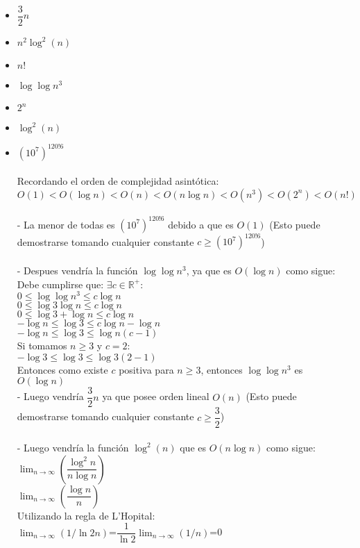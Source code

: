 \documentclass[10pt]{article}
\begin{document}
\begin{enumerate}
\begin{itemize}
  \item $\dfrac{3}{2}n$
  \item $n^2\log^2(n)$
  \item $n!$
  \item $\log \log n^3$
  \item $2^n$
  \item $\log^2(n)$
  \item $(10^7)^{120!6}$
  \\\\Recordando el orden de complejidad asintótica:\\$O(1)<O(\log n)<O(n)<O(n\log n)<O(n^3)<O(2^n)<O(n!)$\\
  \\- La menor de todas es $(10^7)^{120!6}$ debido a que es $O(1)$ (Esto puede demostrarse tomando cualquier constante $c\geq(10^7)^{120!6}$)\\\\
  - Despues vendría la función $\log \log n^3$, ya que es $O(\log n)$ como sigue:\\
  Debe cumplirse que: $\exists c\in\mathbb{R^+}$:\\
  $0\leq \log \log n^3\leq c\log n$\\
  $0\leq \log 3\log n\leq c\log n$\\
  $0\leq \log 3 +\log n\leq c\log n$\\
  $-\log n\leq \log 3\leq c\log n - \log n$\\
  $-\log n\leq \log 3\leq \log n(c-1)$\\
  Si tomamos $n\geq3$ y $c=2$:\\ $-\log 3\leq \log 3\leq \log 3(2-1)$\\
  Entonces como existe $c$ positiva para $n\geq3$, entonces $\log \log n^3$ es $O(\log n)$\\
  - Luego vendría $\dfrac{3}{2}n$ ya que posee orden lineal $O(n)$ (Esto puede demostrarse tomando cualquier constante $c\geq\dfrac{3}{2}$)\\\\
  - Luego vendría la función $\log^2(n)$ que es $O(n\log n)$ como sigue:\\
  $\lim_{n \to \infty}(\dfrac{\log^2n}{n\log n})$\\
  $\lim_{n \to \infty}(\dfrac{\log n}{n})$\\
  Utilizando la regla de L'Hopital:\\
  $\lim_{n \to \infty}(1/\ln{2}n)$=$\dfrac{1}{\ln 2}\lim_{n \to \infty}(1/n)$=0\\

\end{itemize}
\end{enumerate}
\end{document}
